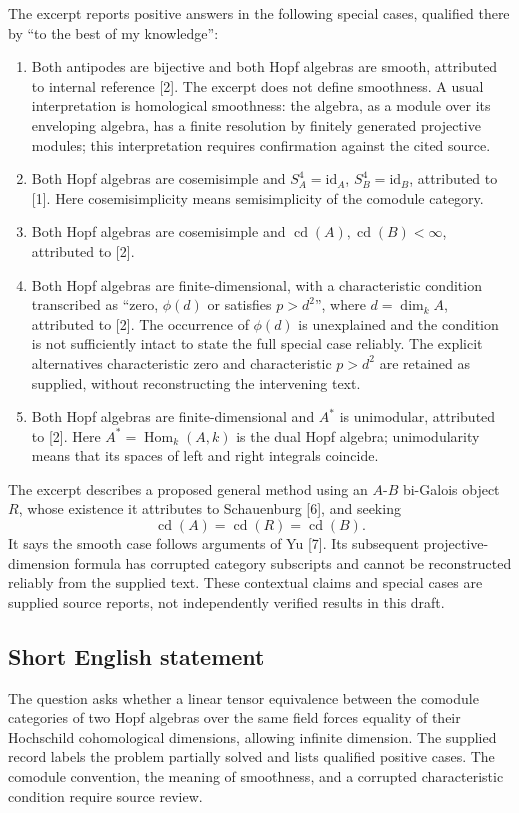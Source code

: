 \documentclass[11pt]{article}
\begin{document}
The excerpt reports positive answers in the following special cases, qualified there by ``to the best of my knowledge'':
\begin{enumerate}
\item Both antipodes are bijective and both Hopf algebras are smooth, attributed to internal reference [2]. The excerpt does not define smoothness. A usual interpretation is homological smoothness: the algebra, as a module over its enveloping algebra, has a finite resolution by finitely generated projective modules; this interpretation requires confirmation against the cited source.
\item Both Hopf algebras are cosemisimple and \(S_A^4=\mathrm{id}_A\), \(S_B^4=\mathrm{id}_B\), attributed to [1]. Here cosemisimplicity means semisimplicity of the comodule category.
\item Both Hopf algebras are cosemisimple and \(\operatorname{cd}(A),\operatorname{cd}(B)<\infty\), attributed to [2].
\item Both Hopf algebras are finite-dimensional, with a characteristic condition transcribed as ``zero, \(\phi(d)\) or satisfies \(p>d^2\)'', where \(d=\dim_k A\), attributed to [2]. The occurrence of \(\phi(d)\) is unexplained and the condition is not sufficiently intact to state the full special case reliably. The explicit alternatives characteristic zero and characteristic \(p>d^2\) are retained as supplied, without reconstructing the intervening text.
\item Both Hopf algebras are finite-dimensional and \(A^*\) is unimodular, attributed to [2]. Here \(A^*=\operatorname{Hom}_k(A,k)\) is the dual Hopf algebra; unimodularity means that its spaces of left and right integrals coincide.
\end{enumerate}
The excerpt describes a proposed general method using an \(A\)-\(B\) bi-Galois object \(R\), whose existence it attributes to Schauenburg [6], and seeking
\[
\operatorname{cd}(A)=\operatorname{cd}(R)=\operatorname{cd}(B).
\]
It says the smooth case follows arguments of Yu [7]. Its subsequent projective-dimension formula has corrupted category subscripts and cannot be reconstructed reliably from the supplied text. These contextual claims and special cases are supplied source reports, not independently verified results in this draft.
\subsection{Short English statement}
The question asks whether a linear tensor equivalence between the comodule categories of two Hopf algebras over the same field forces equality of their Hochschild cohomological dimensions, allowing infinite dimension. The supplied record labels the problem partially solved and lists qualified positive cases. The comodule convention, the meaning of smoothness, and a corrupted characteristic condition require source review.
\end{document}
